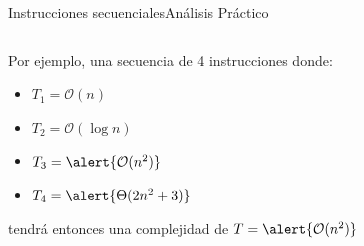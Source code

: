 \documentclass[spanish, c]{beamer}
\newcommand{\bigO}{\mathcal{O}}
\begin{document}
\begin{frame}{Instrucciones secuenciales}{Análisis Práctico}
\begin{columns}
\begin{column}{0.65\textwidth}
            \bigskip

            Por ejemplo, una secuencia de 4 instrucciones donde:
            \begin{itemize}
                \item $T_1 = \bigO(n)$
                \item $T_2 = \bigO(\log n)$
                \item $T_3 = \alert{\bigO(n^2)}$
                \item $T_4 = \alert{\Theta(2n^2 + 3)}$
            \end{itemize}

            \bigskip

            tendrá entonces una complejidad de $T = \alert{\bigO(n^2)}$
        \end{column}
    \end{columns}
\end{frame}
\end{document}
